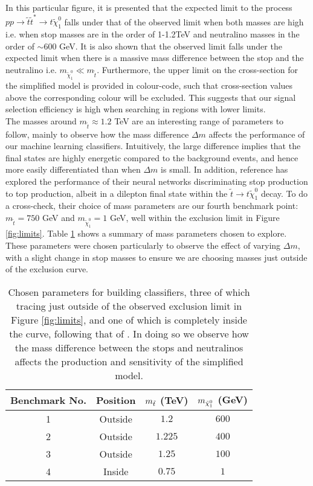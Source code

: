 In this particular figure, it is presented that the expected limit to the process $pp \rightarrow \tilde{t}\tilde{t}^* \rightarrow t\tilde{\chi}_1^0$ falls under that of the observed limit when both masses are high i.e. when stop masses are in the order of 1-1.2TeV and neutralino masses in the order of $\sim600$ GeV. It is also shown that the observed limit falls under the expected limit when there is a massive mass difference between the stop and the neutralino i.e. $m_{\tilde{\chi}_1^0}\ll m_{\tilde{t}}$. Furthermore, the upper limit on the cross-section for the simplified model is provided in colour-code, such that  cross-section values above the corresponding colour will be excluded. This suggests that our signal selection efficiency is high when searching in regions with lower
limits. \\

The masses around $ m_{\tilde{t}} \approx 1.2$ TeV are an interesting range of parameters to follow, mainly to observe how the mass difference $\Delta m$ affects the performance of our machine learning classifiers. Intuitively, the large difference implies that the final states are highly energetic compared to the background events, and hence more easily differentiated than when $\Delta m$ is small. In addition, reference \cite{roxlo2018opening} has explored the performance of their neural networks discriminating stop production to top production, albeit in a dilepton final state within the $\tilde{t} \rightarrow t \tilde{\chi}_1^0$ decay. To do a cross-check, their choice of mass parameters are our fourth benchmark point: $m_{\tilde{t}} =750$ GeV and $m_{\tilde{\chi}_1^0} = 1$ GeV, well within the exclusion limit in Figure \ref{fig:limits}. Table \ref{tab:benchmarks} shows a summary of mass parameters chosen to explore. These parameters were chosen particularly to observe the effect of varying $\Delta m$, with a slight change in stop masses to ensure we are choosing masses just outside of the exclusion curve.

\begin{table}[htbp]
    \centering
    \begin{tabular}{c|c|c|c} 
    \toprule
    Benchmark No. & Position & $m_{\Tilde{t}}$ (TeV) & $m_{\Tilde{\chi}_1^0}$ (GeV) \\
    \midrule
    \rowcolor{gray!6} 1 & Outside & $ 1.2 $ & $ 600 $ \\
    2 & Outside & $ 1.225 $ & $ 400 $ \\
    \rowcolor{gray!6} 3 & Outside & $ 1.25 $ & $ 100 $ \\
    4 & Inside & $ 0.75 $ & $ 1 $\\
    \bottomrule
    \end{tabular}
    \caption{Chosen parameters for building classifiers, three of which tracing just outside of the observed exclusion limit in Figure \ref{fig:limits}, and one of which is completely inside the curve, following that of \cite{roxlo2018opening}. In doing so we observe how the mass difference between the stops and neutralinos affects the production and sensitivity of the simplified model.} 
    \label{tab:benchmarks}
\end{table}

